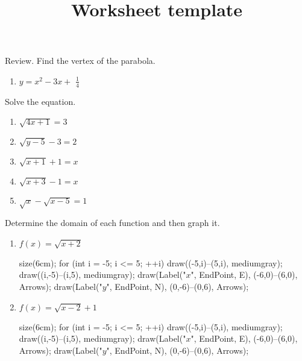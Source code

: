 \documentclass[12pt]{article}
\title{Worksheet template}
\begin{document}
\bigskip
\bigskip

Review.  Find the vertex of the parabola.
\begin{enumerate}
	\item $y = x^2 - 3x + $ {\Large $\frac{1}{4}$}
\end{enumerate}

\bigskip

Solve the equation.

\begin{enumerate}[resume]    
    \item $\sqrt{4x + 1} = 3$
    \item $\sqrt{y-5} - 3 = 2$
    \item $\sqrt{x+1} + 1 = x$
    \item $\sqrt{x+3} - 1 = x$
    \item $\sqrt{x} - \sqrt{x-5} = 1$
\end{enumerate}

\bigskip

Determine the domain of each function and then graph it.

\begin{enumerate}[resume]
	\item $f(x) = \sqrt{x+2}$ \\
    
    \begin{flushright}
	\begin{asy}
	size(6cm);
	for (int i = -5; i <= 5; ++i)
	{
    	draw((-5,i)--(5,i), mediumgray);
	    draw((i,-5)--(i,5), mediumgray);
    }
	draw(Label("$x$", EndPoint, E), (-6,0)--(6,0), Arrows);
	draw(Label("$y$", EndPoint, N), (0,-6)--(0,6), Arrows);
	\end{asy}
	\end{flushright}

	\item $f(x) = \sqrt{x-2} + 1$ \\
    
    \begin{flushright}
	\begin{asy}
	size(6cm);
	for (int i = -5; i <= 5; ++i)
	{
    	draw((-5,i)--(5,i), mediumgray);
	    draw((i,-5)--(i,5), mediumgray);
    }
	draw(Label("$x$", EndPoint, E), (-6,0)--(6,0), Arrows);
	draw(Label("$y$", EndPoint, N), (0,-6)--(0,6), Arrows);
	\end{asy}
	\end{flushright}

\end{enumerate}
\end{document}
